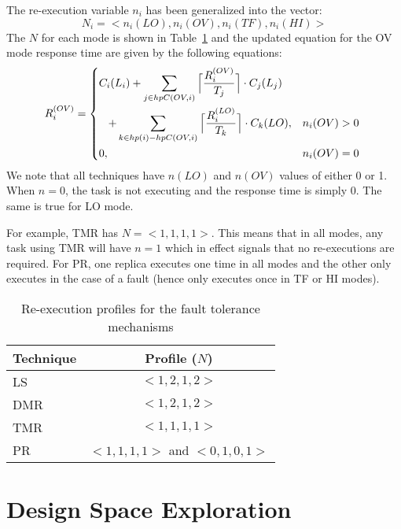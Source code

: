 	The re-execution variable $n_i$ has been generalized into the vector:
\begin{equation}
	N_i=<n_i(LO),n_i(OV),n_i(TF),n_i(HI)>
\end{equation} 
	The $N$ for each mode is shown in Table~\ref{t:reex} and the updated equation for the OV mode response time are given by the following equations:
	\begin{equation}
\begin{aligned}
R_i^{(OV)} =
\begin{dcases*}
C_i(L_i)\color{red} \color{black}+\sum_{j \in hpC(OV,i)}\Big\lceil\frac{R_i^{(OV)}}{T_j}\Big\rceil \cdot C_j(L_j) \\
\hspace{0.3cm} +\sum_{k \in hp(i)-hpC(OV,i)}\Big\lceil\frac{R_i^{(LO)}}{T_k}\Big\rceil \cdot C_k(LO), &  $n_i(OV)>0$ \\
	0, & $n_i(OV)=0$
\end{dcases*}
   \end{aligned}
\end{equation}
	We note that all techniques have $n(LO)$ and $n(OV)$ values of either 0 or 1. When $n=0$, the task is not executing and the response time is simply 0. The same is true for LO mode.
	
	For example, TMR has $N=<1,1,1,1>$. This means that in all modes, any task using TMR will have $n=1$ which in effect signals that no re-executions are required. For PR, one replica executes one time in all modes and the other only executes in the case of a fault (hence only executes once in TF or HI modes).

	\begin{table}
\caption{Re-execution profiles for the fault tolerance mechanisms}
\label{t:reex}
\centering
	\begin{tabular}{@{}l|c@{}}
	\toprule
	Technique & Profile ($N$) \\
	\bottomrule
	LS & $<1,2,1,2>$ \\
	DMR & $<1,2,1,2>$ \\
	TMR & $<1,1,1,1>$ \\
	PR & $<1,1,1,1>$ and $<0,1,0,1>$ \\
	\end{tabular}
\end{table} 	

\section{Design Space Exploration}
\label{s:dse}

